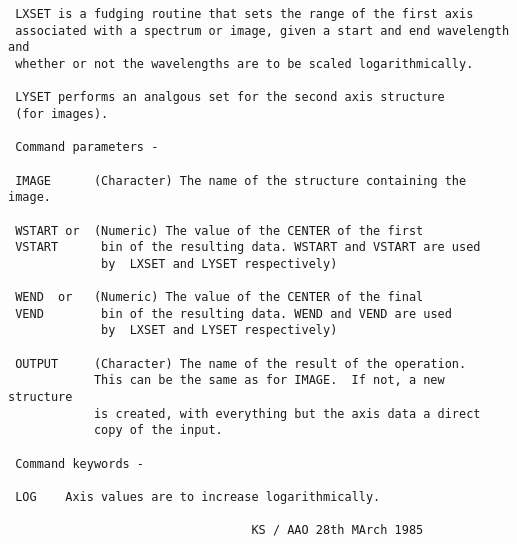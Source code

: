 \begin{description}
\begin{verbatim}
 LXSET is a fudging routine that sets the range of the first axis
 associated with a spectrum or image, given a start and end wavelength and
 whether or not the wavelengths are to be scaled logarithmically.

 LYSET performs an analgous set for the second axis structure
 (for images).

 Command parameters -

 IMAGE      (Character) The name of the structure containing the image.

 WSTART or  (Numeric) The value of the CENTER of the first
 VSTART      bin of the resulting data. WSTART and VSTART are used
             by  LXSET and LYSET respectively)

 WEND  or   (Numeric) The value of the CENTER of the final
 VEND        bin of the resulting data. WEND and VEND are used
             by  LXSET and LYSET respectively)

 OUTPUT     (Character) The name of the result of the operation.
            This can be the same as for IMAGE.  If not, a new structure
            is created, with everything but the axis data a direct
            copy of the input.

 Command keywords -

 LOG    Axis values are to increase logarithmically.

                                  KS / AAO 28th MArch 1985
\end{verbatim}
\end{description}
